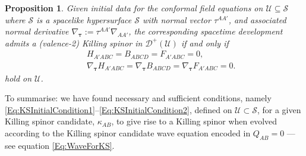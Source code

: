 \documentclass[10pt,a4paper]{article}
\theoremstyle{plain}
\newtheorem{proposition}{Proposition}
\begin{document}
\begin{proposition}\label{Prop:Propagation_KS}
  Given initial data for the conformal field equations on $\mathcal{U}\subseteq\mathcal{S}$
  where $\mathcal{S}$ is a spacelike
hypersurface $\mathcal{S}$ with normal vector $\tau^{AA'}$, and
associated normal derivative $\nabla_{\bm\tau} :=
\tau^{AA'}\nabla_{AA'}$, the corresponding spacetime development
admits a (valence-2) Killing spinor in $\mathcal{D}^{+}(\mathcal{U})$
if and only if
\begin{subequations}
\begin{eqnarray}
  && H_{A'ABC}=B_{ABCD}=F_{A'ABC}=0,\label{Eq:KSInitialCondition1}\\ &&
   \nabla_{\bm\tau} H_{A'ABC}=\nabla_{\bm\tau} B_{ABCD}= \nabla_{\bm\tau} F_{A'ABC}=0 \label{Eq:KSInitialCondition2}.
\end{eqnarray}
\end{subequations}
 hold on $\mathcal{U}$.
\end{proposition}
To summarise: we have found necessary and sufficient conditions,
namely \eqref{Eq:KSInitialCondition1}--\eqref{Eq:KSInitialCondition2},
defined on $\mathcal{U}\subset \mathcal{S}$, for a given Killing
spinor candidate, $\kappa_{AB}$, to give rise to a Killing spinor when
evolved according to the Killing spinor candidate wave equation encoded in $Q_{AB}=0$
---see equation \eqref{Eq:WaveForKS}.
\end{document}
